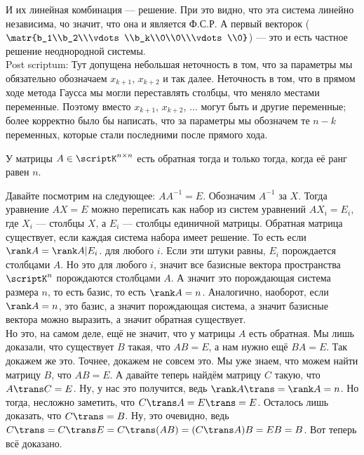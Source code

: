 \documentclass{article}
\begin{document}
\begin{itemize}
\begin{Comment}
            И их линейная комбинация --- решение. При это видно, что эта система линейно независима, чо значит, что она и является Ф.С.Р. А первый векторок ($\matr{b_1\\b_2\\\vdots\\b_k\\0\\0\\\vdots\\0}$) --- это и есть частное решение неоднородной системы.\\
            Post scriptum: Тут допущена небольшая неточность в том, что за параметры мы обязательно обозначаем $x_{k+1}$, $x_{k+2}$ и так далее. Неточность в том, что в прямом ходе метода Гаусса мы могли переставлять столбцы, что меняло местами переменные. Поэтому вместо $x_{k+1}$, $x_{k+2}$, ... могут быть и другие переменные; более корректно было бы написать, что за параметры мы обозначем те $n-k$ переменных, которые стали последними после прямого хода.
        \end{Comment}
        \thm У матрицы $A\in\scriptK^{n\times n}$ есть обратная тогда и только тогда, когда её ранг равен $n$.
        \begin{Proof}
            Давайте посмотрим на следующее: $AA^{-1}=E$. Обозначим $A^{-1}$ за $X$. Тогда уравнение $AX=E$ можно переписать как набор из систем уравнений $AX_i=E_i$, где $X_i$ --- столбцы $X$, а $E_i$ --- столбцы единичной матрицы. Обратная матрица существует, если каждая система набора имеет решение. То есть если $\rank A=\rank A|E_i$. для любого $i$. Если эти штуки равны, $E_i$ порождается столбцами $A$. Но это для любого $i$, значит все базисные вектора пространства $\scriptK^n$ порождаются столбцами $A$. А значит это порождающая система размера $n$, то есть базис, то есть $\rank A=n$. Аналогично, наоборот, если $\rank A=n$, это базис, а значит порождающая система, а значит базисные вектора можно выразить, а значит обратная существует.\\
            Но это, на самом деле, ещё не значит, что у матрицы $A$ есть обратная. Мы лишь доказали, что существует $B$ такая, что $AB=E$, а нам нужно ещё $BA=E$. Так докажем же это. Точнее, докажем не совсем это. Мы уже знаем, что можем найти матрицу $B$, что $AB=E$. А давайте теперь найдём матрицу $C$ такую, что $A\trans C=E$. Ну, у нас это получится, ведь $\rank A\trans=\rank A=n$. Но тогда, несложно заметить, что $C\trans A=E\trans=E$. Осталось лишь доказать, что $C\trans=B$. Ну, это очевидно, ведь $C\trans=C\trans E=C\trans(AB)=(C\trans A)B=EB=B$. Вот теперь всё доказано.

\end{Proof}
\end{itemize}
\end{document}
